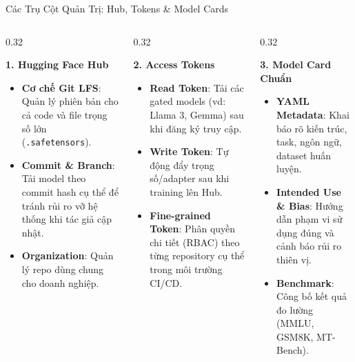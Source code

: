\documentclass[aspectratio=169, 10pt]{beamer}
\begin{document}
\begin{frame}{Các Trụ Cột Quản Trị: Hub, Tokens \& Model Cards}
\begin{columns}[T]
  \begin{column}{0.32\textwidth}
    \begin{block}{\textbf{1. Hugging Face Hub}}
      \begin{itemize}
        \item \textbf{Cơ chế Git LFS}: Quản lý phiên bản cho cả code và file trọng số lớn (\texttt{.safetensors}).
        \item \textbf{Commit \& Branch}: Tải model theo commit hash cụ thể để tránh rủi ro vỡ hệ thống khi tác giả cập nhật.
        \item \textbf{Organization}: Quản lý repo dùng chung cho doanh nghiệp.
      \end{itemize}
    \end{block}
  \end{column}

  \begin{column}{0.32\textwidth}
    \begin{block}{\textbf{2. Access Tokens}}
      \begin{itemize}
        \item \textbf{Read Token}: Tải các gated models (vd: Llama 3, Gemma) sau khi đăng ký truy cập.
        \item \textbf{Write Token}: Tự động đẩy trọng số/adapter sau khi training lên Hub.
        \item \textbf{Fine-grained Token}: Phân quyền chi tiết (RBAC) theo từng repository cụ thể trong môi trường CI/CD.
      \end{itemize}
    \end{block}
  \end{column}

  \begin{column}{0.32\textwidth}
    \begin{block}{\textbf{3. Model Card Chuẩn}}
      \begin{itemize}
        \item \textbf{YAML Metadata}: Khai báo rõ kiến trúc, task, ngôn ngữ, dataset huấn luyện.
        \item \textbf{Intended Use \& Bias}: Hướng dẫn phạm vi sử dụng đúng và cảnh báo rủi ro thiên vị.
        \item \textbf{Benchmark}: Công bố kết quả đo lường (MMLU, GSM8K, MT-Bench).
      \end{itemize}
    \end{block}
  \end{column}
\end{columns}

\end{frame}
\end{document}
